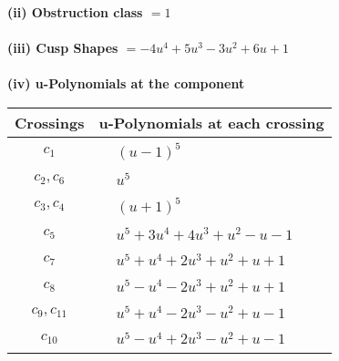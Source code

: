 \documentclass[1p]{elsarticle_modified}
\theoremstyle{definition}
\begin{document}
\flushleft \textbf{(ii) Obstruction class $= 1$}\\~\\
\flushleft \textbf{(iii) Cusp Shapes $= -4 u^4+5 u^3-3 u^2+6 u+1$}\\~\\
\newpage\renewcommand{\arraystretch}{1}
\flushleft \textbf{(iv) u-Polynomials at the component}\newline \\
\begin{tabular}{m{50pt}|m{274pt}}
Crossings & \hspace{64pt}u-Polynomials at each crossing \\
\hline $$\begin{aligned}c_{1}\end{aligned}$$&$\begin{aligned}
&(u-1)^5
\end{aligned}$\\
\hline $$\begin{aligned}c_{2},c_{6}\end{aligned}$$&$\begin{aligned}
&u^5
\end{aligned}$\\
\hline $$\begin{aligned}c_{3},c_{4}\end{aligned}$$&$\begin{aligned}
&(u+1)^5
\end{aligned}$\\
\hline $$\begin{aligned}c_{5}\end{aligned}$$&$\begin{aligned}
&u^5+3 u^4+4 u^3+u^2- u-1
\end{aligned}$\\
\hline $$\begin{aligned}c_{7}\end{aligned}$$&$\begin{aligned}
&u^5+u^4+2 u^3+u^2+u+1
\end{aligned}$\\
\hline $$\begin{aligned}c_{8}\end{aligned}$$&$\begin{aligned}
&u^5- u^4-2 u^3+u^2+u+1
\end{aligned}$\\
\hline $$\begin{aligned}c_{9},c_{11}\end{aligned}$$&$\begin{aligned}
&u^5+u^4-2 u^3- u^2+u-1
\end{aligned}$\\
\hline $$\begin{aligned}c_{10}\end{aligned}$$&$\begin{aligned}
&u^5- u^4+2 u^3- u^2+u-1
\end{aligned}$\\
\hline
\end{tabular}\\~\\
\end{document}
